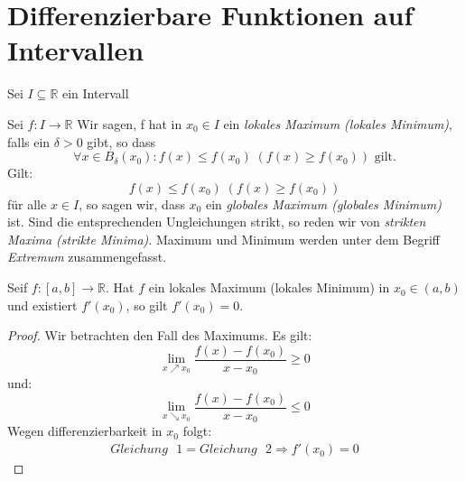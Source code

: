 \section{Differenzierbare Funktionen auf Intervallen}
Sei $I \subseteq \mathbb{R}$ ein Intervall
\begin{Definition}{
	Sei $f: I \rightarrow \mathbb{R}$ Wir sagen, f hat in $x_0 \in I$ ein 
	\emph{lokales Maximum (lokales Minimum)}, falls ein $\delta > 0$ gibt,
	so dass 
	\begin{equation*}
	\forall x \in B_\delta(x_0) : f(x) \leq f(x_0) \; (f(x) \geq f(x_0)) \text{ gilt.}
	\end{equation*}
	Gilt:
	\begin{equation*}
		f(x) \leq f(x_0) \; (f(x) \geq f(x_0))
	\end{equation*}
	 für alle $x \in I$, so sagen wir, dass 
	$x_0$ ein \emph{globales Maximum (globales Minimum)} ist.
	Sind die entsprechenden Ungleichungen strikt, so reden wir von 
	\emph{strikten Maxima (strikte Minima)}. Maximum und Minimum werden unter dem 
	Begriff \emph{Extremum} zusammengefasst.
}\end{Definition}

\begin{Satz}{
	\label{satz_8}
	Seif $f:[a,b] \rightarrow \mathbb{R}$. Hat $f$ ein lokales Maximum (lokales 
	Minimum) in $x_0 \in (a,b)$ und existiert $f'(x_0)$, so gilt 
	$f'(x_0) = 0$.
}\end{Satz}

\begin{proof}
	Wir betrachten den Fall des Maximums.
	Es gilt:
	\begin{equation*}
		\label{gleichung:bedingungi}
		\lim\limits_{x \nearrow x_0}{ \frac{f(x)-f(x_0)}{x-x_0} \geq 0}
	\end{equation*}
	und:
	\begin{equation*}
		\label{gleichung:bedingungii}
		\lim\limits_{x \searrow x_0}{\frac{f(x)-f(x_0)}{x-x_0} \leq 0}
	\end{equation*}
	Wegen differenzierbarkeit in $x_0$ folgt:
	\begin{align*}
		Gleichung\text{ }1 = Gleichung \text{ }2 \Rightarrow 
		f'(x_0) = 0
	\end{align*}	
\end{proof}
